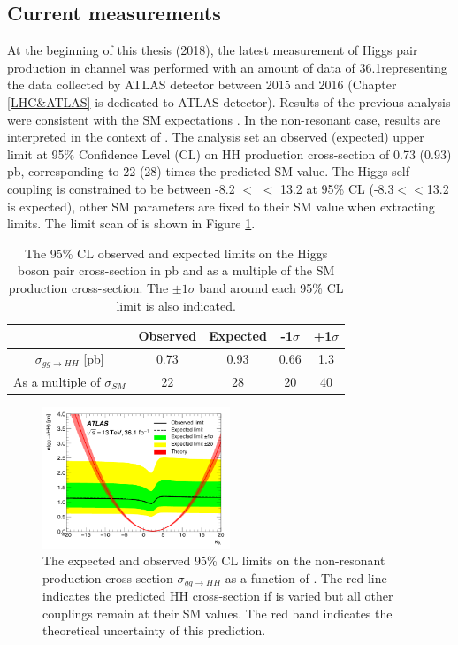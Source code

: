 \subsection{Current measurements}
\label{chap1:HH:CM}
At the beginning of this thesis (2018), the latest measurement of Higgs pair production in \HHyybb channel was performed with an amount of data of 36.1\ifb representing the data collected by ATLAS detector between 2015 and 2016 (Chapter \ref{LHC&ATLAS} is dedicated to ATLAS detector). Results of the previous analysis were consistent with the SM expectations \cite{yybb_36ifb}. In the non-resonant case, results are interpreted in the context of \kl. The analysis set an observed (expected) upper limit at  95\% Confidence Level (CL) on HH production cross-section of 0.73 (0.93) pb, corresponding to 22 (28) times the predicted SM value. The Higgs self-coupling is constrained to be between -8.2 $<$ \kl $<$ 13.2 at 95\% CL (-8.3$<$\kl$<$13.2 is expected), other SM parameters are fixed to their SM value when extracting limits. The limit scan of \kl is shown in Figure \ref{fig:chap1:HH:CM:KL}. \\

\begin{table}[htbp]
    \centering
    \begin{tabular}{ccccc}
    \hline
         & Observed & Expected & -1$\sigma$ & +1$\sigma$ \\
    \hline
        $\sigma_{gg\rightarrow HH}$ [pb] & 0.73 & 0.93 & 0.66 & 1.3 \\
        As a multiple of $\sigma_{SM}$ & 22 & 28 & 20 & 40 \\
        \hline
    \end{tabular}
    \caption{The 95\% CL observed and expected limits on the Higgs boson pair cross-section in pb and as a multiple of the SM production cross-section. The $\pm1\sigma$ band around each 95\% CL limit is also indicated.}
    \label{tab:chap1:HH:CM:XSEC}
\end{table}
\begin{figure}[htbp]
    \centering
    \includegraphics[width=0.5\textwidth]{Ch1/Img/kl_36ifb.png}
    \caption{The expected and observed 95\% CL limits on the non-resonant production cross-section $\sigma_{gg\rightarrow HH}$ as a function of \kl. The red line indicates the predicted HH cross-section if \kl is varied but all other couplings remain at their SM values. The red band indicates the theoretical uncertainty of this prediction.}
    \label{fig:chap1:HH:CM:KL}
\end{figure}

